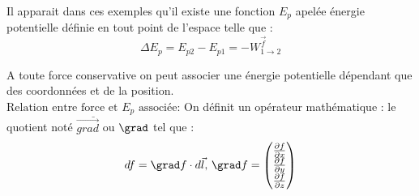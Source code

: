 \documentclass{article}
\begin{document}
Il apparait dans ces exemples qu'il existe une fonction \(E_p\) apelée énergie potentielle définie en tout point de l'espace telle que :\\
\[
    \Delta E_p = E_{p2} - E_{p1} = -W^{\vec{f}}_{1\to 2}   
\]

A toute force conservative on peut associer une énergie potentielle dépendant que des coordonnées et de la position. \\
\(\underline{\text{Relation entre force et } E_{p} \text{ associée:}}\)  
On définit un opérateur mathématique : le quotient noté \(\vec{grad}\) ou \(\grad \) tel que : 
\[
    df = \grad f \cdot d\vec{l}, \, \grad f = \begin{pmatrix}
         \frac{\partial f}{\partial x} \\
         \frac{\partial f}{\partial y} \\
          \frac{\partial f}{\partial z}\\
    \end{pmatrix}
\]
\end{document}
